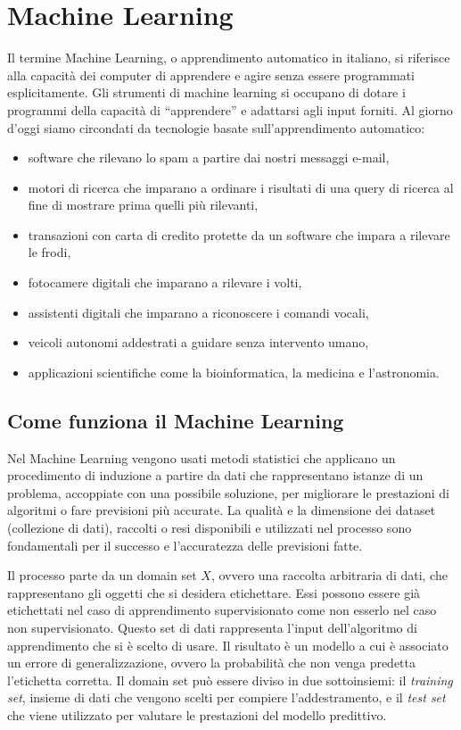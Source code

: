 \documentclass[12pt,italian]{report}
\begin{document}
\chapter{Machine Learning}
Il termine Machine Learning, o apprendimento automatico in italiano, si riferisce alla capacità dei computer di apprendere e agire senza essere programmati esplicitamente.
Gli strumenti di machine learning si occupano di dotare i programmi della capacità di ``apprendere'' e adattarsi agli input forniti.
Al giorno d'oggi siamo circondati da tecnologie basate sull'apprendimento automatico:
\begin{itemize}
	\item software che rilevano lo spam a partire dai nostri messaggi e-mail, 
	\item motori di ricerca che imparano a ordinare i risultati di una query di ricerca al fine di mostrare prima quelli più rilevanti, 
	\item transazioni con carta di credito protette da un software che impara a rilevare le frodi, 
	\item fotocamere digitali che imparano a rilevare i volti, 
	\item assistenti digitali che imparano a riconoscere i comandi vocali, 
	\item veicoli autonomi addestrati a guidare senza intervento umano, 
	\item applicazioni scientifiche come la bioinformatica, la medicina e l'astronomia.
\end{itemize}
\section{Come funziona il Machine Learning}
\label{ComefunzionailMachineLearning}
Nel Machine Learning vengono usati metodi statistici che applicano un procedimento di induzione a partire da dati che rappresentano istanze di un problema, accoppiate con una possibile soluzione, per migliorare le prestazioni di algoritmi o fare previsioni più accurate.
La qualità e la dimensione dei dataset (collezione di dati), raccolti o resi disponibili e utilizzati nel processo sono fondamentali per il successo e l'accuratezza delle previsioni fatte.

Il processo parte da un domain set $X$, ovvero una raccolta arbitraria di dati, che rappresentano gli oggetti che si desidera etichettare. Essi possono essere già etichettati nel caso di apprendimento supervisionato come non esserlo nel caso non supervisionato. Questo set di dati rappresenta l'input dell'algoritmo di apprendimento che si è scelto di usare. Il risultato è un modello a cui è associato un errore di generalizzazione, ovvero la probabilità che non venga predetta l'etichetta corretta.
Il domain set può essere diviso in due sottoinsiemi: il \textit{training set}, insieme di dati che vengono scelti per compiere l'addestramento, e il \textit{test set} che viene utilizzato per valutare le prestazioni del modello predittivo.
\end{document}
